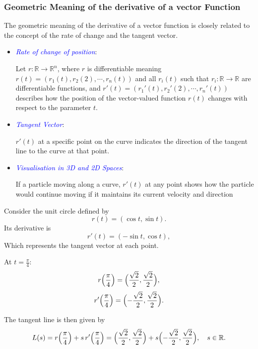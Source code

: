 \documentclass{beamer}
\begin{document}
\begin{frame}[allowframebreaks]
\frametitle{Geometric Meaning of the derivative of a vector Function}

The geometric meaning of the derivative of a vector function is closely related to the concept of the rate of change and the tangent vector.
\begin{itemize}
\item \textcolor{blue}{\textit{Rate of change of position}}:

\begin{block}{}
    Let $r:\mathbb{R}\rightarrow \mathbb{R}^n$, where $r$ is differentiable meaning $r(t)=(r_1(t),r_2(2),\cdots ,r_n(t))$ and all $r_i(t)$ such that $r_i:\mathbb{R}\rightarrow \mathbb{R}$ are differentiable functions, and $r'(t)=(r_1'(t),r_2'(2),\cdots ,r_n'(t))$ describes how the position of the vector-valued function $r(t)$ changes with respect to the parameter $t$.
\end{block}

\item \textcolor{blue}{\textit{Tangent Vector}}: 

\begin{block}{}
    $r'(t)$ at a specific point on the curve indicates the direction of the tangent line to the curve at that point.
\end{block}

\item \textcolor{blue}{\textit{Visualisation in 3D and 2D Spaces}}: \\
\begin{block}{}
    If a particle moving along a curve, $r'(t)$ at any point shows how the particle would continue moving if it maintains its current velocity and direction
\end{block}

\end{itemize} 
Consider the unit circle defined by 
  \[
  r(t) = (\cos t, \sin t).
  \]
  Its derivative is 
  \[
  r'(t) = (-\sin t, \cos t),
  \]
  Which represents the tangent vector at each point.

  At \(t=\frac{\pi}{4}\):
  \[
  r\Bigl(\frac{\pi}{4}\Bigr)=\Bigl(\frac{\sqrt{2}}{2}, \frac{\sqrt{2}}{2}\Bigr),
  \]
  \[
  r'\Bigl(\frac{\pi}{4}\Bigr)=\Bigl(-\frac{\sqrt{2}}{2}, \frac{\sqrt{2}}{2}\Bigr).
  \]
  
  The tangent line is then given by
  \[
  L(s)=r\Bigl(\frac{\pi}{4}\Bigr) + s\,r'\Bigl(\frac{\pi}{4}\Bigr)
  = \Bigl(\frac{\sqrt{2}}{2}, \frac{\sqrt{2}}{2}\Bigr) + s\Bigl(-\frac{\sqrt{2}}{2}, \frac{\sqrt{2}}{2}\Bigr),
  \quad s\in\mathbb{R}.
  \]
\begin{center}
    

\end{center}
\end{frame}
\end{document}
